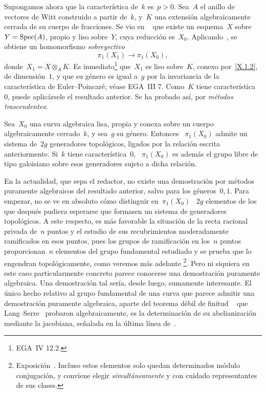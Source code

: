Supongamos ahora que la característica de~$k$ es~$p>0$. Sea~$A$ el anillo de
vectores de Witt construido a partir de~$k$, y~$K$ una extensión
algebraicamente cerrada de su cuerpo de fracciones. Se vio en
~ que existe un esquema~$X$ sobre~$Y=\operatorname{Spec}(A)$, propio y liso
sobre~$Y$, cuya reducción es~$X_0$. Aplicando~, se obtiene un
homomorfismo \emph{sobreyectivo}
$$
\pi_1(X_1)\to\pi_1(X_0),
$$
donde~$X_1=X\otimes_AK$. Es inmediato\footnote{\Cf EGA~IV 12.2.} que~$X_1$
es liso sobre~$K$, conexo por~\eqref{X.1.2}, de dimensión~$1$, y que su género
es igual a~$g$ por la invariancia de la característica de Euler--Poincaré;
véase EGA~III 7. Como~$K$ tiene característica~$0$, puede aplicársele el
resultado anterior. Se ha probado así, por \emph{métodos trascendentes}:

\begin{theoreme}
\label{X.2.6}
Sea~$X_0$ una curva algebraica lisa, propia y conexa sobre un
cuerpo algebraicamente cerrado~$k$, y sea~$g$ su género. Entonces
~$\pi_1(X_0)$ admite un sistema de~$2g$ generadores topológicos, ligados por la
relación escrita anteriormente. Si~$k$ tiene característica~$0$,
~$\pi_1(X_0)$ es además el grupo libre de tipo galoisiano sobre esos generadores
sujeto a dicha relación.
\end{theoreme}

\begin{remarques}
\label{X.2.7}
En la actualidad, que sepa el redactor, no existe una demostración por métodos
puramente algebraicos del resultado anterior, salvo para los géneros~$0,1$.
Para empezar, no se ve en absoluto cómo distinguir en~$\pi_1(X_0)$
~$2g$ elementos de los que después pudiera esperarse que formasen un sistema de
generadores topológicos. A este respecto, es más favorable la situación de la
recta racional privada de~$n$ puntos y el estudio de sus recubrimientos
moderadamente ramificados en esos puntos, pues los grupos de ramificación en
los~$n$ puntos proporcionan~$n$ elementos del grupo fundamental estudiado y se
prueba que lo engendran topológicamente, como veremos más adelante
\footnote{\Cf Exposición~. Incluso estos elementos solo quedan
determinados módulo conjugación, y conviene elegir \emph{simultáneamente} y con
cuidado representantes de sus clases.}. Pero ni siquiera en este caso
particularmente concreto parece conocerse una demostración puramente
algebraica. Una demostración tal sería, desde luego, sumamente interesante. El
único hecho relativo al grupo fundamental de una curva que parece admitir una
demostración puramente algebraica, aparte del teorema débil de finitud
~ que Lang--Serre~\cite{X.2} probaron algebraicamente, es la
determinación de su abelianización mediante la jacobiana, señalada en la última
línea de~.
\end{remarques}
